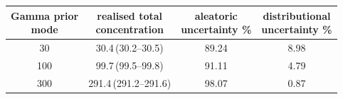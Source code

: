\begin{tabular}{cccc}
\toprule
\shortstack{Gamma prior\\mode} & \shortstack{realised total\\concentration} & \shortstack{aleatoric\\uncertainty \%} & \shortstack{distributional\\uncertainty \%} \\
\midrule
30 & 30.4\,(30.2--30.5) & 89.24 & 8.98 \\
100 & 99.7\,(99.5--99.8) & 91.11 & 4.79 \\
300 & 291.4\,(291.2--291.6) & 98.07 & 0.87 \\
\bottomrule
\end{tabular}
